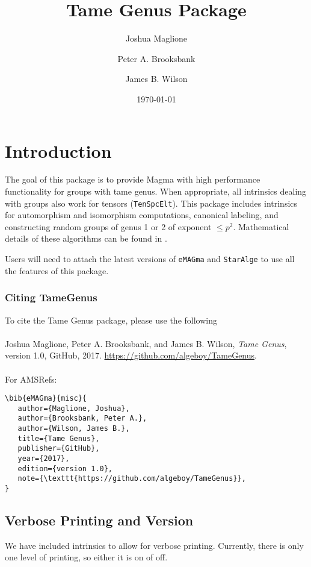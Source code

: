 \documentclass{documentation}
\title{Tame Genus Package}
\author{Joshua Maglione}
\author{Peter A. Brooksbank}
\author{James B. Wilson}
\date{\today}
\begin{document}
\frontmatter

\maketitle
\tableofcontents

\mainmatter

\chapter{Introduction}

The goal of this package is to provide {\sc Magma} \cite{Magma} with high performance functionality for groups with tame genus. 
When appropriate, all intrinsics dealing with groups also work for tensors ({\tt TenSpcElt}). 
This package includes intrinsics for automorphism and isomorphism computations, canonical labeling, and constructing random groups of genus 1 or 2 of exponent  $\leq p^2$. 
Mathematical details of these algorithms can be found in \cite{BMW}.

Users will need to attach the latest versions of \texttt{eMAGma} \cite{eMAGma} and \texttt{StarAlge} \cite{StarAlge} to use all the features of this package. 

\subsection*{Citing TameGenus} 
To cite the Tame Genus package, please use the following\\
\\
Joshua Maglione, Peter A. Brooksbank, and James B. Wilson, \emph{Tame Genus}, version 1.0, GitHub, 2017. \url{https://github.com/algeboy/TameGenus}. \\
\\
For AMSRefs:
\begin{verbatim}
\bib{eMAGma}{misc}{
   author={Maglione, Joshua},
   author={Brooksbank, Peter A.},
   author={Wilson, James B.},
   title={Tame Genus},
   publisher={GitHub},
   year={2017},
   edition={version 1.0},
   note={\texttt{https://github.com/algeboy/TameGenus}},
}
\end{verbatim}


\section{Verbose Printing and Version}

We have included intrinsics to allow for verbose printing. 
Currently, there is only one level of printing, so either it is on of off. 
\end{document}
